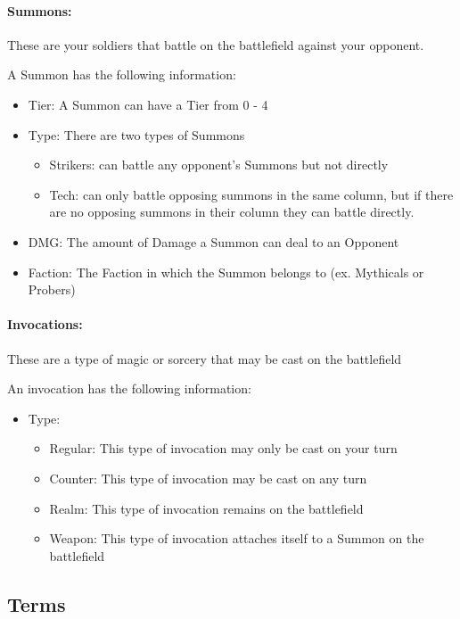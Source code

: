\documentclass[12pt, letterpaper]{article}
\begin{document}
\paragraph{Summons: \\}
\par These are your soldiers that battle on the battlefield against your opponent. 
\par A Summon has the following information: 
\begin{itemize}
    \item Tier: A Summon can have a Tier from 0 - 4
    \item Type: There are two types of Summons 
    \begin{itemize}
        \item Strikers:  can battle any opponent's Summons but not directly
        \item Tech: can only battle opposing summons in the same column, but if there are no opposing summons in their column they can battle directly.
    \end{itemize}
    \item DMG: The amount of Damage a Summon can deal to an Opponent
    \item Faction: The Faction in which the Summon belongs to (ex. Mythicals or Probers)
\end{itemize}
\paragraph{Invocations: \\}
\par These are a type of magic or sorcery that may be cast on the battlefield 
\par An invocation has the following information: 
\begin{itemize}
    \item Type: 
    \begin{itemize}
        \item Regular: This type of invocation may only be cast on your turn 
        \item Counter: This type of invocation may be cast on any turn
        \item Realm: This type of invocation remains on the battlefield
        \item Weapon: This type of invocation attaches itself to a Summon on the battlefield
    \end{itemize}
\end{itemize}
\newpage
\subsection{Terms}
\end{document}

